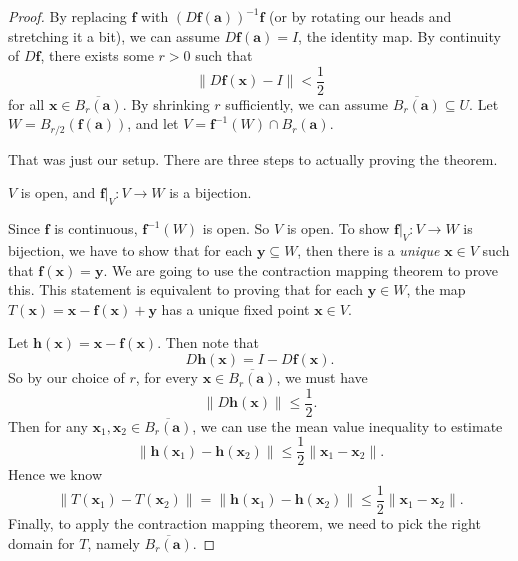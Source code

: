\documentclass[a4paper]{article}
\begin{document}
\begin{proof}
  By replacing $\mathbf{f}$ with $(D\mathbf{f}(\mathbf{a}))^{-1} \mathbf{f}$ (or by rotating our heads and stretching it a bit), we can assume $D\mathbf{f}(\mathbf{a}) = I$, the identity map. By continuity of $D \mathbf{f}$, there exists some $r > 0$ such that
  \[
    \|D \mathbf{f}(\mathbf{x}) - I\| < \frac{1}{2}
  \]
  for all $\mathbf{x} \in \overline{B_r(\mathbf{a})}$. By shrinking $r$ sufficiently, we can assume $\overline{B_r(\mathbf{a})} \subseteq U$. Let $W = B_{r/2}(\mathbf{f}(\mathbf{a}))$, and let $V = \mathbf{f}^{-1}(W) \cap B_r(\mathbf{a})$.

  That was just our setup. There are three steps to actually proving the theorem.
  \begin{claim}
    $V$ is open, and $\mathbf{f}|_{V}: V \to W$ is a bijection.
  \end{claim}
  Since $\mathbf{f}$ is continuous, $\mathbf{f}^{-1}(W)$ is open. So $V$ is open. To show $\mathbf{f}|_V: V \to W$ is bijection, we have to show that for each $\mathbf{y} \subseteq W$, then there is a \emph{unique} $\mathbf{x} \in V$ such that $\mathbf{f}(\mathbf{x}) = \mathbf{y}$. We are going to use the contraction mapping theorem to prove this. This statement is equivalent to proving that for each $\mathbf{y} \in W$, the map $T(\mathbf{x}) = \mathbf{x} - \mathbf{f}(\mathbf{x}) + \mathbf{y}$ has a unique fixed point $\mathbf{x} \in V$.

  Let $\mathbf{h}(\mathbf{x}) = \mathbf{x} - \mathbf{f}(\mathbf{x})$. Then note that
  \[
    D \mathbf{h}(\mathbf{x}) = I - D \mathbf{f}(\mathbf{x}).
  \]
  So by our choice of $r$, for every $\mathbf{x} \in \overline{B_r(\mathbf{a})}$, we must have
  \[
    \|D \mathbf{h}(\mathbf{x})\| \leq \frac{1}{2}.
  \]
  Then for any $\mathbf{x}_1, \mathbf{x}_2 \in \overline{B_r(\mathbf{a})}$, we can use the mean value inequality to estimate
  \[
    \|\mathbf{h}(\mathbf{x}_1) - \mathbf{h} (\mathbf{x}_2)\| \leq \frac{1}{2} \|\mathbf{x}_1 - \mathbf{x}_2\|.
  \]
  Hence we know
  \[
    \|T(\mathbf{x}_1) - T (\mathbf{x}_2)\| = \|\mathbf{h}(\mathbf{x}_1) - \mathbf{h}(\mathbf{x}_2)\| \leq \frac{1}{2}\|\mathbf{x}_1 - \mathbf{x}_2\|.
  \]
  Finally, to apply the contraction mapping theorem, we need to pick the right domain for $T$, namely $\overline{B_r(\mathbf{a})}$.


\end{proof}
\end{document}
